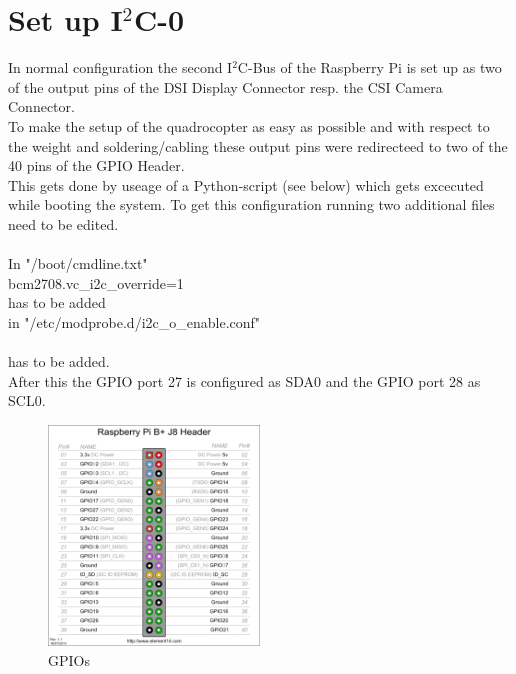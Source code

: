 \newpage

\section{Set up I$^2$C-0}
\label{sec:setupi2c0}


In normal configuration the second I$^2$C-Bus of the Raspberry Pi is set up as two of the output pins of the DSI Display Connector resp. the CSI Camera Connector.\\
To make the setup of the quadrocopter as easy as possible and with respect to the weight and soldering/cabling these output pins were redirecteed to two of the 40 pins of the GPIO Header.\\

This gets done by useage of a Python-script (see below) which gets excecuted while booting the system. To get this configuration running two additional files need to be edited.\\\\
In "/boot/cmdline.txt"\\
\ttfamily bcm2708.vc\_i2c\_override=1 \\
\normalfont has to be added\\
in "/etc/modprobe.d/i2c\_o\_enable.conf"\\
 \\
\normalfont has to be added.\\

After this the GPIO port 27 is configured as SDA0 and the GPIO port 28 as SCL0.

\begin{figure}[H]
	\centering\includegraphics[width=0.5\textwidth]{fig/gpios}
	\caption{GPIOs \footnotemark}
	\label{fig:gpios}
\end{figure}
\newpage







